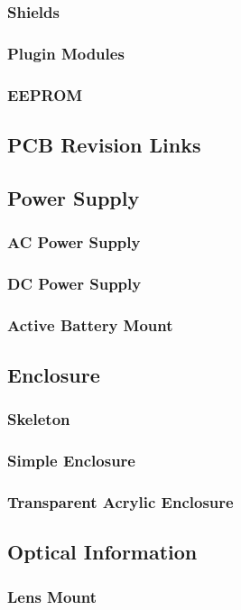 \documentclass{article}
\begin{document}
\subsubsection{Shields}
\subsubsection{Plugin Modules}
\subsubsection{EEPROM}
\subsection{PCB Revision Links}
\subsection{Power Supply}
\subsubsection{AC Power Supply}
\subsubsection{DC Power Supply}
\subsubsection{Active Battery Mount}
\subsection{Enclosure}
\subsubsection{Skeleton}
\subsubsection{Simple Enclosure}
\subsubsection{Transparent Acrylic Enclosure}
\subsection{Optical Information}
\subsubsection{Lens Mount}
\end{document}
